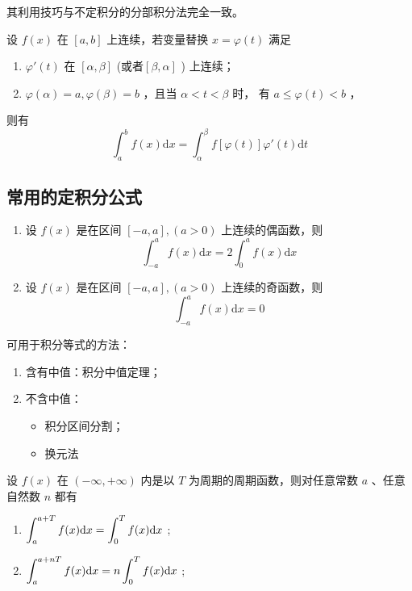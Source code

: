 其利用技巧与不定积分的分部积分法完全一致。


设 $ f(x) $ 在 $ [a,b] $ 上连续，若变量替换 $ x=\varphi(t) $ 满足
\begin{enumerate}
    \item $ \varphi'(t) $ 在 $ [\alpha,\beta] $ (或者$ [\beta,\alpha] $ ) 上连续；
    \item $ \varphi(\alpha) = a , \varphi(\beta) = b $ ，且当 $ \alpha < t < \beta $ 时，
    有 $ a \leq \varphi(t) < b $ ，
\end{enumerate}
则有$$
    \int_a^b f(x)\mathrm{d}x = \int_\alpha^\beta f[\varphi(t)]\varphi'(t)\mathrm{d}t
$$ 

\subsection{常用的定积分公式}


\begin{enumerate}
    \item 设 $ f(x) $ 是在区间 $ [-a,a],(a>0) $ 上连续的偶函数，则$$
        \int_{-a}^a f(x)\mathrm{d}x = 2 \int_0^a f(x)\mathrm{d}x
    $$ 
    \item 设 $ f(x) $ 是在区间 $ [-a,a],(a>0) $ 上连续的奇函数，则$$
        \int_{-a}^af(x)\mathrm{d}x = 0
    $$ 
\end{enumerate}

可用于积分等式的方法：
\begin{enumerate}
    \item 含有中值：积分中值定理；
    \item 不含中值：\begin{itemize}
        \item 积分区间分割；
        \item 换元法
    \end{itemize}
\end{enumerate}


设 $ f(x) $ 在 $ (-\infty,+\infty) $ 内是以 $ T $ 为周期的周期函数，则对任意常数 $ a $ 、任意自然数 $ n $ 
都有\begin{enumerate}
    \item $ \displaystyle \int_a^{a+T}f(x)\mathrm{d}x = \int_0^T f(x)\mathrm{d}x $ ;
    \item $ \displaystyle \int_a^{a+nT}f(x)\mathrm{d}x = n\int_0^T f(x)\mathrm{d}x $ ;
\end{enumerate}

